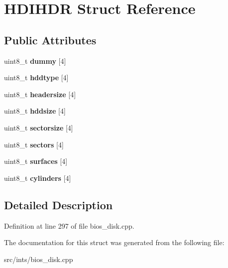 \hypertarget{structHDIHDR}{\section{H\-D\-I\-H\-D\-R Struct Reference}
\label{structHDIHDR}
}
\subsection*{Public Attributes}
\begin{DoxyCompactItemize}
\item 
\hypertarget{structHDIHDR_ae41c262463f3201e383a1c9390ae901c}{uint8\-\_\-t {\bfseries dummy} \mbox{[}4\mbox{]}}\label{structHDIHDR_ae41c262463f3201e383a1c9390ae901c}

\item 
\hypertarget{structHDIHDR_ab51b532bb68c10726d57f635bb77dc4d}{uint8\-\_\-t {\bfseries hddtype} \mbox{[}4\mbox{]}}\label{structHDIHDR_ab51b532bb68c10726d57f635bb77dc4d}

\item 
\hypertarget{structHDIHDR_ab03e0699debea645f1ba0571ddedf82a}{uint8\-\_\-t {\bfseries headersize} \mbox{[}4\mbox{]}}\label{structHDIHDR_ab03e0699debea645f1ba0571ddedf82a}

\item 
\hypertarget{structHDIHDR_a552e396437dfc751af75133fc9abd875}{uint8\-\_\-t {\bfseries hddsize} \mbox{[}4\mbox{]}}\label{structHDIHDR_a552e396437dfc751af75133fc9abd875}

\item 
\hypertarget{structHDIHDR_a2dc5f3e10810fa24566f03f8b26dab4f}{uint8\-\_\-t {\bfseries sectorsize} \mbox{[}4\mbox{]}}\label{structHDIHDR_a2dc5f3e10810fa24566f03f8b26dab4f}

\item 
\hypertarget{structHDIHDR_aa8388e85e4ef3007467293eea28e0082}{uint8\-\_\-t {\bfseries sectors} \mbox{[}4\mbox{]}}\label{structHDIHDR_aa8388e85e4ef3007467293eea28e0082}

\item 
\hypertarget{structHDIHDR_a74ee482205337db4273020bef91f3056}{uint8\-\_\-t {\bfseries surfaces} \mbox{[}4\mbox{]}}\label{structHDIHDR_a74ee482205337db4273020bef91f3056}

\item 
\hypertarget{structHDIHDR_a61459f45085bcacd0325cc64862fc396}{uint8\-\_\-t {\bfseries cylinders} \mbox{[}4\mbox{]}}\label{structHDIHDR_a61459f45085bcacd0325cc64862fc396}

\end{DoxyCompactItemize}


\subsection{Detailed Description}


Definition at line 297 of file bios\-\_\-disk.\-cpp.



The documentation for this struct was generated from the following file\-:\begin{DoxyCompactItemize}
\item 
src/ints/bios\-\_\-disk.\-cpp\end{DoxyCompactItemize}
